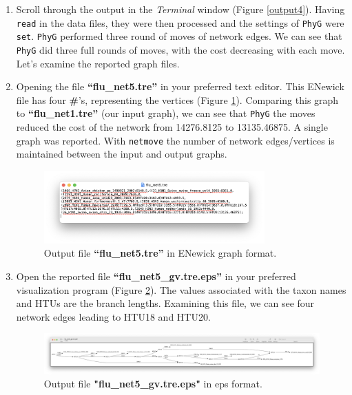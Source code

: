 \documentclass[11pt]{article}
\newcommand{\phyg}{\texttt{PhyG} }
\begin{document}
\begin {enumerate}
\item Scroll through the output in the \textit{Terminal} window (Figure \ref{output4}). 
Having \texttt{read} in the data files, they were then processed and the settings of 
\phyg were \texttt{set}. \phyg performed three round of moves of network edges.
We can see that \phyg did three full rounds of moves, with the cost decreasing 
with each move.\\

Let's examine the reported graph files. 

\item Opening the file \textbf{``flu\_net5.tre''} in your preferred text editor. This 
ENewick file has four \textbf{\#}'s, representing the vertices (Figure \ref{tre5}). 
Comparing this graph to \textbf{``flu\_net1.tre''} (our input graph), we can see 
that \phyg the moves reduced the cost of the network from 14276.8125 to 
13135.46875. A single graph was reported. With \texttt{netmove} the number 
of network edges/vertices is maintained between the input and output graphs.

\begin{figure}[H]
\centering
\includegraphics[width=0.8\textwidth]{tre5.png}
\caption{Output file \textbf{``flu\_net5.tre''} in ENewick graph format.}
\label{tre5}
\end{figure}

\item  Open the reported file \textbf{``flu\_net5\_gv.tre.eps''} in your preferred
visualization program (Figure \ref{eps5}). The values associated with the taxon 
names and HTUs are the branch lengths. Examining this file, we can see four
network edges leading to HTU18 and HTU20.

\begin{figure}[H]
\centering
\includegraphics[width=\textwidth]{eps5.png}
\caption{Output file \textbf{"flu\_net5\_gv.tre.eps"} in eps format.}
\label{eps5}
\end{figure}


\end{enumerate}
\end{document}
